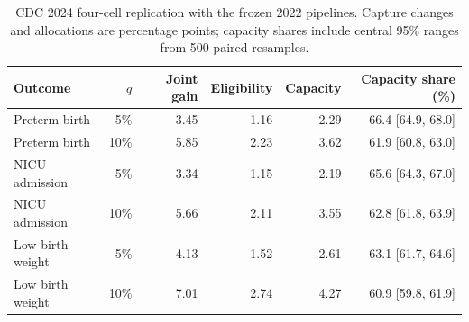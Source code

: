 \begin{table}[htbp]
\centering
\caption{CDC 2024 four-cell replication with the frozen 2022 pipelines. Capture changes and allocations are percentage points; capacity shares include central 95\% ranges from 500 paired resamples.}
\label{tab:temporal_2024}
\small
\begin{tabular*}{\linewidth}{@{\extracolsep{\fill}}lrrrrr@{}}
\toprule
Outcome & $q$ & Joint gain & Eligibility & Capacity & Capacity share (\%) \\
\midrule
Preterm birth & 5\% & 3.45 & 1.16 & 2.29 & 66.4 [64.9, 68.0] \\
Preterm birth & 10\% & 5.85 & 2.23 & 3.62 & 61.9 [60.8, 63.0] \\
NICU admission & 5\% & 3.34 & 1.15 & 2.19 & 65.6 [64.3, 67.0] \\
NICU admission & 10\% & 5.66 & 2.11 & 3.55 & 62.8 [61.8, 63.9] \\
Low birth weight & 5\% & 4.13 & 1.52 & 2.61 & 63.1 [61.7, 64.6] \\
Low birth weight & 10\% & 7.01 & 2.74 & 4.27 & 60.9 [59.8, 61.9] \\
\bottomrule
\end{tabular*}
\end{table}
